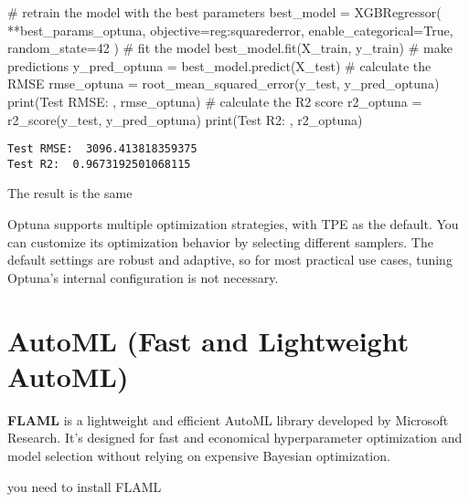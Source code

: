 \documentclass[
  letterpaper,
  DIV=11,
  numbers=noendperiod]{scrreprt}
\newenvironment{Shaded}{\begin{snugshade}}{\end{snugshade}}
\newcommand{\BuiltInTok}[1]{\textcolor[rgb]{0.00,0.23,0.31}{#1}}
\newcommand{\CommentTok}[1]{\textcolor[rgb]{0.37,0.37,0.37}{#1}}
\newcommand{\DecValTok}[1]{\textcolor[rgb]{0.68,0.00,0.00}{#1}}
\newcommand{\NormalTok}[1]{\textcolor[rgb]{0.00,0.23,0.31}{#1}}
\newcommand{\OperatorTok}[1]{\textcolor[rgb]{0.37,0.37,0.37}{#1}}
\newcommand{\StringTok}[1]{\textcolor[rgb]{0.13,0.47,0.30}{#1}}
\newcommand{\VariableTok}[1]{\textcolor[rgb]{0.07,0.07,0.07}{#1}}
\begin{document}
\begin{Shaded}
\begin{Highlighting}[]
\CommentTok{\# retrain the model with the best parameters}
\NormalTok{best\_model }\OperatorTok{=}\NormalTok{ XGBRegressor(}
    \OperatorTok{**}\NormalTok{best\_params\_optuna,}
\NormalTok{    objective}\OperatorTok{=}\StringTok{\textquotesingle{}reg:squarederror\textquotesingle{}}\NormalTok{,}
\NormalTok{    enable\_categorical}\OperatorTok{=}\VariableTok{True}\NormalTok{,}
\NormalTok{    random\_state}\OperatorTok{=}\DecValTok{42}
\NormalTok{)}
\CommentTok{\# fit the model}
\NormalTok{best\_model.fit(X\_train, y\_train)}
\CommentTok{\# make predictions}
\NormalTok{y\_pred\_optuna }\OperatorTok{=}\NormalTok{ best\_model.predict(X\_test)}
\CommentTok{\# calculate the RMSE}
\NormalTok{rmse\_optuna }\OperatorTok{=}\NormalTok{ root\_mean\_squared\_error(y\_test, y\_pred\_optuna)}
\BuiltInTok{print}\NormalTok{(}\StringTok{\textquotesingle{}Test RMSE: \textquotesingle{}}\NormalTok{, rmse\_optuna)}
\CommentTok{\# calculate the R2 score}
\NormalTok{r2\_optuna }\OperatorTok{=}\NormalTok{ r2\_score(y\_test, y\_pred\_optuna)}
\BuiltInTok{print}\NormalTok{(}\StringTok{\textquotesingle{}Test R2: \textquotesingle{}}\NormalTok{, r2\_optuna)}
\end{Highlighting}
\end{Shaded}

\begin{verbatim}
Test RMSE:  3096.413818359375
Test R2:  0.9673192501068115
\end{verbatim}

The result is the same

Optuna supports multiple optimization strategies, with TPE as the
default. You can customize its optimization behavior by selecting
different samplers. The default settings are robust and adaptive, so for
most practical use cases, tuning Optuna's internal configuration is not
necessary.

\section{AutoML (Fast and Lightweight
AutoML)}\label{automl-fast-and-lightweight-automl}

\textbf{FLAML} is a lightweight and efficient AutoML library developed
by Microsoft Research. It's designed for fast and economical
hyperparameter optimization and model selection without relying on
expensive Bayesian optimization.

you need to install FLAML
\end{document}
